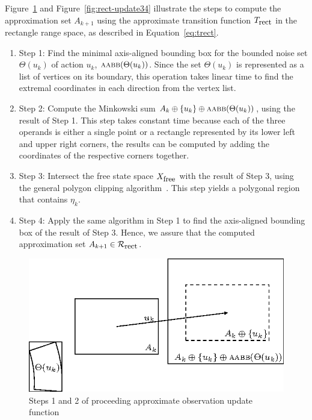 Figure~\ref{fig:rect-update12} and Figure~\ref{fig:rect-update34} illustrate the steps to
compute the approximation set $A_{k+1}$ using the approximate transition function $T_{\mbox{\small rect}}$ in the rectangle range space, as described in Equation~\ref{eq:trect}.

\begin{enumerate}
\item Step 1: Find the minimal axis-aligned bounding box for the bounded noise set
  $\Theta(u_k)$ of action $u_k$, $\textsc{aabb}(\Theta(u_k))$. 
  Since the set $\Theta(u_k)$ is represented as a list of vertices on its boundary, this
  operation takes linear time to find the extremal coordinates in each direction
  from the vertex list.

\item Step 2: Compute the Minkowski sum $A_k \oplus \{ u_k \} \oplus \textsc{aabb}(\Theta(u_k))$, 
  using the result of Step 1. 
  This step takes constant time because each of the three operands is either a single point or a rectangle
  represented by its lower left and upper right corners, the results can be
  computed by adding the coordinates of the respective corners together.
	
\item Step 3: Intersect the free state space $X_{\mbox{\small free}}$ with the result of Step
  3, using the general polygon clipping algorithm~\cite{Vat92}. 
  This step yields a polygonal region that contains $\eta_k$.

\item Step 4: Apply the same algorithm in Step 1 to find the axis-aligned
  bounding box of the result of Step 3. 
  Hence, we assure that the computed approximation set $A_{k+1} \in \mathcal{R}_{\mbox{\small rect}}$.
\end{enumerate}
\begin{figure}
\centering
  \includegraphics[scale=1.2]{figs/rect-update2}  
  \caption{Steps 1 and 2 of proceeding approximate observation update function}
  \label{fig:rect-update12}
\end{figure}

